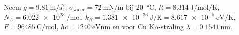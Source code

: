 
Neem $g = \SI{9.81}{\metre\per\second\squared}$, $\sigma_{\text{water}} = \SI{72}{\milli\newton\per\metre}$ bij \SI{20}{\celsius}, $R = \SI{8.314}{\joule\per\mole\per\kelvin}$, $N_A = \SI{6.022e23}{\per\mole}$, $k_B = \SI{1.381e-23}{\joule\per\kelvin} = \SI{8.617e-5}{\electronvolt\per\kelvin}$, $F = \SI{96485}{\coulomb\per\mole}$, $hc = \SI{1240}{\electronvolt\nano\metre}$ en voor Cu K$\alpha$-straling $\lambda = \SI{0.1541}{\nano\metre}$.


